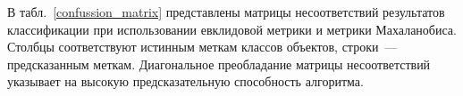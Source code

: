 	\begin{table}[!ht]
		\centering
		\caption{Матрицы несоответствий}
		\qquad
		\label{confussion_matrix}
	\end{table}
	
	В табл.~\ref{confussion_matrix} представлены матрицы несоответствий результатов классификации при использовании
	евклидовой метрики и метрики Махаланобиса.
	Столбцы соответствуют истинным меткам классов объектов, строки~--- предсказанным меткам.
	Диагональное преобладание матрицы несоответствий указывает на высокую предсказательную способность алгоритма.
	
